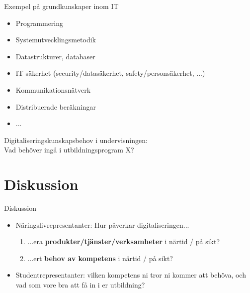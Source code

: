 \documentclass[aspectratio=169]{beamer}
\newcommand{\EndSlide}{\begin{frame}[plain]\endpage\end{frame}}
\newenvironment{Slide}[1]%
  {\begin{frame}[environment=Slide]{#1}}
  {\end{frame}}%
\begin{document}
\begin{Slide}{Exempel på grundkunskaper inom IT}
\begin{itemize}
  \item Programmering
  \item Systemutvecklingsmetodik
  \item Datastrukturer, databaser
  \item IT-säkerhet (security/datasäkerhet, safety/personsäkerhet, ...)
  \item Kommunikationsnätverk
  \item Distribuerade beräkningar
  \item ...
\end{itemize}  
Digitaliseringskunskapsbehov i undervisningen:\\Vad behöver ingå i utbildningsprogram X?
\end{Slide}



\section{Diskussion}

\begin{Slide}{Diskussion}
  \begin{itemize}
    \item Näringslivrepresentanter: Hur påverkar digitaliseringen...
    \begin{enumerate}
        \item  ...era \textbf{produkter/tjänster/verksamheter} i
        närtid / på sikt?
        
        \item ...ert \textbf{behov av kompetens} i närtid / på
        sikt?
    \end{enumerate}
    \item Studentrepresentanter: vilken kompetens ni tror ni kommer att behöva, och vad som vore bra att få in i er utbildning?
  \end{itemize}
\end{Slide}

\EndSlide
\end{document}
